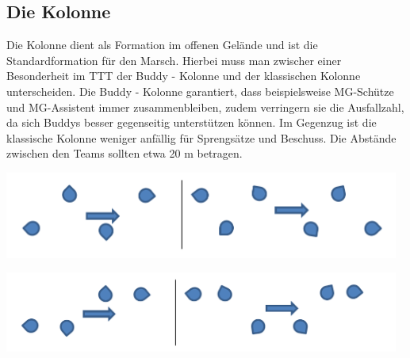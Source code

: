 \subsection{Die Kolonne}
Die Kolonne dient als Formation im offenen Gelände und ist die Standardformation für den Marsch. Hierbei muss man zwischer einer Besonderheit im \ac{TTT} der Buddy - Kolonne und der klassischen Kolonne unterscheiden. Die Buddy - Kolonne garantiert, dass beispielsweise MG-Schütze und MG-Assistent immer zusammenbleiben, zudem verringern sie die Ausfallzahl, da sich Buddys besser gegenseitig unterstützen können. Im Gegenzug ist die klassische Kolonne weniger anfällig für Sprengsätze und Beschuss. Die Abstände zwischen den Teams sollten etwa 20 m betragen.\\
\begin{minipage}[t]{1\textwidth}
	\includegraphics[width=13cm]{./img/grundlagen/formationen/Kolonne.png}
	\label{Kolonne}
\end{minipage}
\begin{minipage}[t]{1\textwidth}
	\includegraphics[width=13cm]{./img/grundlagen/formationen/Buddykolonne.png}
\end{minipage}

